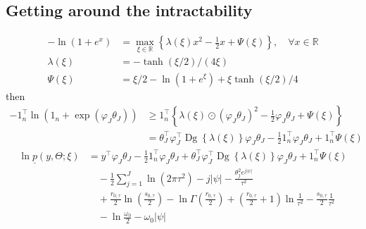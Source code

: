 \documentclass[11pt]{article}
\newcommand{\opn}{\operatorname}
\begin{document}
\subsection{Getting around the intractability}
\begin{align*}
  -\ln\left(1+e^{x}\right) &= \max_{\xi \in \mathbb{R}}\left\{\lambda\left(\xi\right)x^{2} - \frac{1}{2}x+\Psi\left(\xi\right) \right\}, \quad \forall x \in \mathbb{R}\\
  \lambda\left(\xi\right) &= -\tanh\left(\xi/2\right)/\left(4\xi\right)\\
  \Psi\left(\xi\right) &= \xi/2 - \ln\left(1+e^{\xi}\right) + \xi\tanh\left(\xi/2\right)/4
\end{align*}
then
\begin{align*}
  -1_{n}^{\top}\ln\left(1_{n}+\exp\left(\varphi_{J}\theta_{J}\right)\right) &\geq 1_{n}^{\top}\left\{\lambda\left(\xi\right) \odot \left(\varphi_{J}\theta_{J}\right)^{2} -\frac{1}{2}\varphi_{J}\theta_{J} + \Psi\left(\xi\right) \right\}\\
  &= \theta_{J}^{\top}\varphi_{J}^{\top}\opn{Dg}\left\{\lambda\left(\xi\right) \right\}\varphi_{J}\theta_{J} -\frac{1}{2}1_{n}^{\top}\varphi_{J}\theta_{J} + 1_{n}^{\top}\Psi\left(\xi\right)
\end{align*}
\begin{align*}
  \ln \underline{p}\left(y,\Theta;\xi\right) &= y^{\top}\varphi_{J}\theta_{J} -\frac{1}{2}1_{n}^{\top}\varphi_{J}\theta_{J} +\theta_{J}^{\top}\varphi_{J}^{\top}\opn{Dg}\left\{\lambda\left(\xi\right) \right\}\varphi_{J}\theta_{J} +1_{n}^{\top}\Psi\left(\xi\right) \\
    &\quad -\frac{1}{2}\sum_{j=1}^{J}\ln\left(2\pi\tau^{2}\right) - j\left|\psi\right| - \frac{\theta_{j}^{2}e^{j\left|\psi\right|}}{\tau^{2}}\\
    &\quad +\frac{r_{0,\tau}}{2}\ln\left(\frac{s_{0,\tau}}{2}\right) - \ln\Gamma\left(\frac{r_{0,\tau}}{2}\right) + \left(\frac{r_{0,\tau}}{2}+1\right)\ln\frac{1}{\tau^{2}} -\frac{s_{0,\tau}}{2}\frac{1}{\tau^{2}}\\
    &\quad -\ln\frac{\omega_{0}}{2} -\omega_{0}\left|\psi\right|
\end{align*}
\end{document}
